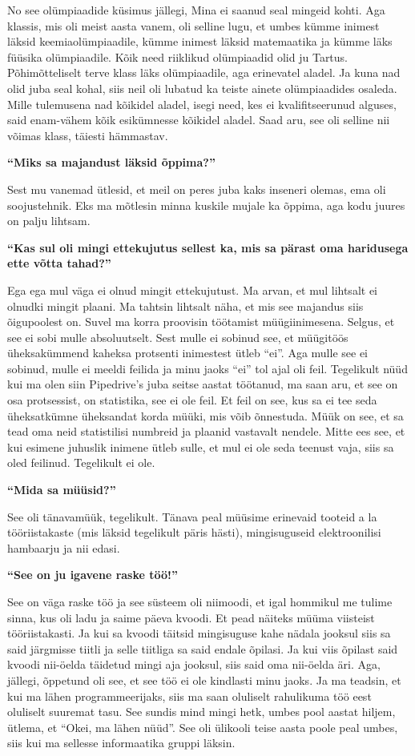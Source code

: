No see olümpiaadide küsimus jällegi, Mina ei saanud seal mingeid kohti. Aga 
klassis, mis oli meist aasta vanem,
 oli selline lugu, et umbes kümme inimest läksid keemiaolümpiaadile, kümme 
inimest läksid matemaatika ja kümme läks füüsika olümpiaadile. Kõik need 
riiklikud olümpiaadid olid ju Tartus. Põhimõtteliselt terve klass läks 
olümpiaadile, aga erinevatel aladel. Ja kuna nad olid juba seal kohal, siis 
neil oli lubatud  ka teiste ainete olümpiaadides osaleda. Mille tulemusena nad 
kõikidel aladel, isegi need, kes ei kvalifitseerunud alguses, said enam-vähem 
kõik esikümnesse kõikidel aladel. Saad aru, see oli selline nii võimas klass, 
täiesti hämmastav.

\textbf{\enquote{Miks sa majandust läksid õppima?}}

Sest mu vanemad ütlesid, et meil on peres juba kaks inseneri olemas, ema oli 
soojustehnik. Eks ma mõtlesin minna kuskile mujale ka õppima, aga  kodu juures 
on palju lihtsam. 

\textbf{\enquote{Kas sul oli mingi ettekujutus sellest ka, mis sa pärast oma 
haridusega ette võtta tahad?}}

Ega ega mul väga ei olnud mingit ettekujutust. Ma arvan, et mul lihtsalt ei 
olnudki mingit plaani. Ma tahtsin lihtsalt näha, et mis  see majandus siis 
õigupoolest on. Suvel ma korra proovisin töötamist müügiinimesena. Selgus, et 
see ei sobi mulle absoluutselt. Sest mulle ei sobinud see, et müügitöös 
üheksakümmend kaheksa protsenti inimestest ütleb \enquote{ei}. Aga mulle see ei 
sobinud, mulle ei meeldi feilida ja minu jaoks \enquote{ei} tol ajal oli feil. 
Tegelikult nüüd kui ma olen siin Pipedrive's juba seitse 
aastat töötanud, ma saan aru, et see on osa protsessist, on statistika, see ei 
ole feil. Et feil on see, kus sa ei tee seda üheksatkümne üheksandat korda 
müüki, mis võib õnnestuda. Müük on see, et sa tead oma neid statistilisi 
numbreid ja plaanid vastavalt nendele. Mitte ees see, et kui esimene juhuslik 
inimene ütleb sulle, et mul ei ole seda teenust vaja, siis sa oled feilinud. 
Tegelikult ei ole.

\textbf{\enquote{Mida sa müüsid?}}

See oli tänavamüük, tegelikult. Tänava peal müüsime erinevaid tooteid a la 
tööriistakaste (mis läksid tegelikult päris hästi), mingisuguseid 
elektroonilisi hambaarju ja nii edasi.

\textbf{\enquote{See on ju igavene raske töö!}}

See on väga raske töö ja  see süsteem oli niimoodi, et igal hommikul me tulime 
sinna, kus oli ladu ja saime päeva kvoodi. Et pead näiteks müüma viisteist 
tööriistakasti. Ja kui sa kvoodi täitsid mingisuguse kahe nädala jooksul siis 
sa said järgmisse tiitli ja selle tiitliga sa said endale õpilasi. Ja kui viis 
õpilast said kvoodi nii-öelda täidetud mingi aja jooksul, siis said oma 
nii-öelda äri. Aga, jällegi, õppetund oli see, et see töö ei ole kindlasti minu 
jaoks. Ja ma teadsin, et kui ma lähen programmeerijaks, siis ma saan oluliselt 
rahulikuma töö eest oluliselt suuremat tasu. See sundis mind mingi hetk, umbes 
pool aastat hiljem, ütlema, et \enquote{Okei, ma lähen nüüd}. See oli ülikooli 
teise aasta poole peal umbes, siis kui ma sellesse informaatika gruppi läksin.

